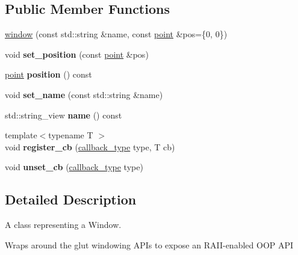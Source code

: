 \subsection*{Public Member Functions}
\begin{DoxyCompactItemize}
\item 
\hyperlink{classtwod_1_1window_a77c285c655bae5324a9d2b28c5816562}{window} (const std\+::string \&name, const \hyperlink{structtwod_1_1point__t}{point} \&pos=\{0, 0\})
\item 
\mbox{\label{classtwod_1_1window_a25d93aae6fa5ede8f2f140b8845e857b}} 
void {\bfseries set\+\_\+position} (const \hyperlink{structtwod_1_1point__t}{point} \&pos)
\item 
\mbox{\label{classtwod_1_1window_a96d10d330d49cca88f8040ea584d70b3}} 
\hyperlink{structtwod_1_1point__t}{point} {\bfseries position} () const
\item 
\mbox{\label{classtwod_1_1window_a880e2543705aa7dcfd9a5d7239ef1824}} 
void {\bfseries set\+\_\+name} (const std\+::string \&name)
\item 
\mbox{\label{classtwod_1_1window_a8db8ec410916ffb8d9e34c433ee97d58}} 
std\+::string\+\_\+view {\bfseries name} () const
\item 
\mbox{\label{classtwod_1_1window_a5cd1aaecb578e69bdd905d87fe4325da}} 
{\footnotesize template$<$typename T $>$ }\\void {\bfseries register\+\_\+cb} (\hyperlink{classtwod_1_1window_a3d6203e1119b54e35b4a08db799929da}{callback\+\_\+type} type, T cb)
\item 
\mbox{\label{classtwod_1_1window_abfbad4affd63f52ff6f5d3156fa3b27c}} 
void {\bfseries unset\+\_\+cb} (\hyperlink{classtwod_1_1window_a3d6203e1119b54e35b4a08db799929da}{callback\+\_\+type} type)
\end{DoxyCompactItemize}


\subsection{Detailed Description}
A class representing a Window.

Wraps around the glut windowing A\+P\+Is to expose an R\+A\+I\+I-\/enabled O\+OP A\+PI 

